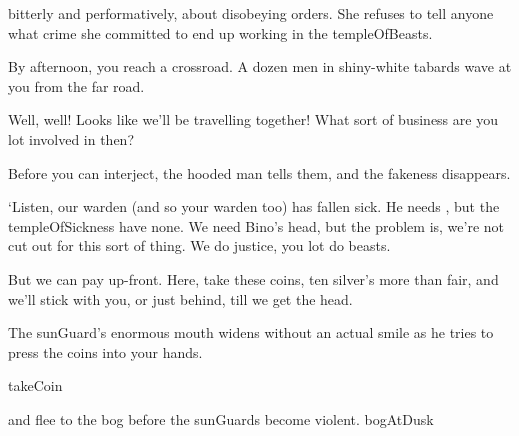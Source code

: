 bitterly and performatively, about disobeying orders.
She refuses to tell anyone what crime she committed to end up working in the \gls{templeOfBeasts}.

By afternoon, you reach a crossroad.
A dozen men in shiny-white tabards wave at you from the far road.

\begin{speechtext}
  Well, well!
  Looks like we'll be travelling together!
  What sort of business are you lot involved in then?
\end{speechtext}

Before you can interject, the hooded man tells them, and the fakeness disappears.

\begin{speechtext}
  `Listen, our \gls{warden} (and so your \gls{warden} too) has fallen sick.
  He needs , but the \gls{templeOfSickness} have none.
  We need Bino's head, but the problem is, we're not cut out for this sort of thing.
  We do justice, you lot do beasts.

  But we can pay up-front.
  Here, take these coins, ten silver's more than fair, and we'll stick with you, or just behind, till we get the head.
\end{speechtext}

The \gls{sunGuard}'s enormous mouth widens without an actual smile as he tries to press the coins into your hands.

\begin{selectPath}
  {}%
  {takeCoin}

  {and flee to the bog before the \glspl{sunGuard} become violent.}%
  {bogAtDusk}
\end{selectPath}
